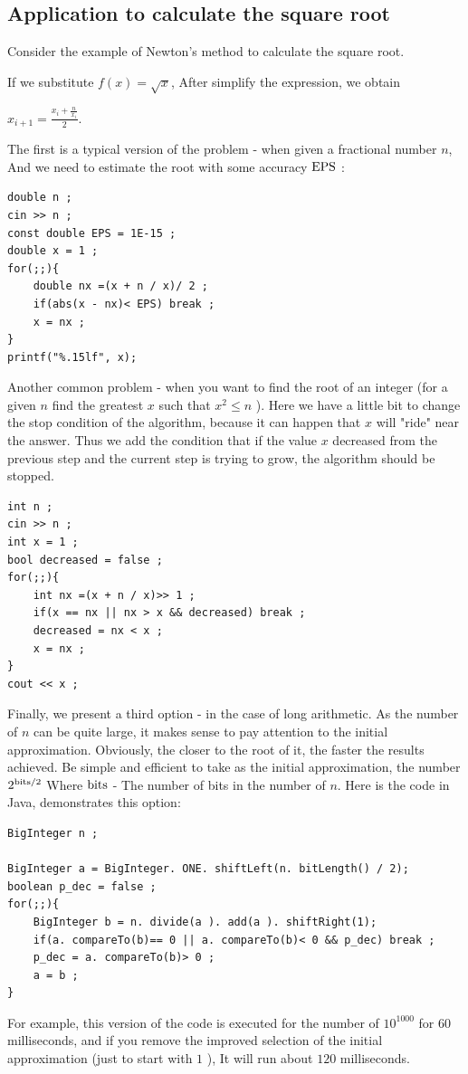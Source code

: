 \subsection{ Application to calculate the square root }

Consider the example of Newton's method to calculate the square root.

If we substitute $f (x) = \sqrt {x}$, After simplify the expression, we obtain

$x_ {i +1} = \frac {x_i + \frac {n} {x_i}} {2}.$

The first is a typical version of the problem - when given a fractional number $n$, And we need to estimate the root with some accuracy $\rm EPS$ :

\begin{verbatim}
double n ;
cin >> n ;
const double EPS = 1E-15 ;
double x = 1 ;
for(;;){
    double nx =(x + n / x)/ 2 ;
    if(abs(x - nx)< EPS) break ;
    x = nx ;
}
printf("%.15lf", x); 
\end{verbatim}
Another common problem - when you want to find the root of an integer (for a given $n$ find the greatest $x$ such that $x ^ 2 \le n$ ). Here we have a little bit to change the stop condition of the algorithm, because it can happen that $x$ will "ride" near the answer. Thus we add the condition that if the value $x$ decreased from the previous step and the current step is trying to grow, the algorithm should be stopped.

\begin{verbatim}
int n ;
cin >> n ;
int x = 1 ;
bool decreased = false ;
for(;;){
    int nx =(x + n / x)>> 1 ;
    if(x == nx || nx > x && decreased) break ;
    decreased = nx < x ;
    x = nx ;
}
cout << x ; 
\end{verbatim}
Finally, we present a third option - in the case of long arithmetic. As the number of $n$ can be quite large, it makes sense to pay attention to the initial approximation. Obviously, the closer to the root of it, the faster the results achieved. Be simple and efficient to take as the initial approximation, the number $2 ^ {{\rm bits} / 2}$ Where $\rm bits$ - The number of bits in the number of $n$. Here is the code in Java, demonstrates this option:

\begin{verbatim}
BigInteger n ;
 
BigInteger a = BigInteger. ONE. shiftLeft(n. bitLength() / 2);
boolean p_dec = false ;
for(;;){
    BigInteger b = n. divide(a ). add(a ). shiftRight(1);
    if(a. compareTo(b)== 0 || a. compareTo(b)< 0 && p_dec) break ;
    p_dec = a. compareTo(b)> 0 ;
    a = b ;
} 
\end{verbatim}
For example, this version of the code is executed for the number of $10 ^ {1000}$ for $60$ milliseconds, and if you remove the improved selection of the initial approximation (just to start with $1$ ), It will run about $120$ milliseconds.

